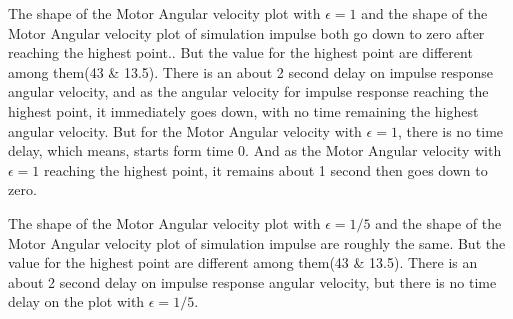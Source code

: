 The shape of the Motor Angular velocity  plot with $\epsilon = 1$ and the shape of the Motor  Angular velocity plot of simulation impulse both go down to zero after reaching the highest point.. But the value for the highest point are different among them(43 \& 13.5). There is an about 2 second delay on impulse response angular velocity, and  as the angular velocity for impulse response reaching the highest point, it immediately goes down, with no time remaining the highest angular velocity. But for the Motor Angular velocity with $\epsilon = 1$, there is no time delay, which  means, starts form time 0. And as the Motor Angular velocity with $\epsilon = 1$ reaching the highest point, it remains about 1 second then goes down to zero.

The shape of the Motor Angular velocity  plot with $\epsilon = 1/5$ and the shape of the Motor Angular velocity plot of simulation impulse are roughly the same. But the value for the highest point are different among them(43 \& 13.5). There is an about 2 second delay on impulse response angular velocity, but there is no time delay on the plot with $\epsilon = 1/5$.

